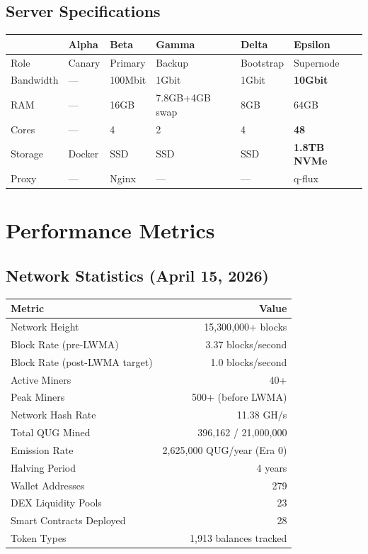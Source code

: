 \documentclass[12pt,a4paper]{article}
\begin{document}
\subsection{Server Specifications}

\begin{center}
\begin{tabular}{@{}llllll@{}}
\toprule
& \textbf{Alpha} & \textbf{Beta} & \textbf{Gamma} & \textbf{Delta} & \textbf{Epsilon} \\
\midrule
Role & Canary & Primary & Backup & Bootstrap & Supernode \\
Bandwidth & --- & 100Mbit & 1Gbit & 1Gbit & \textbf{10Gbit} \\
RAM & --- & 16GB & 7.8GB+4GB swap & 8GB & 64GB \\
Cores & --- & 4 & 2 & 4 & \textbf{48} \\
Storage & Docker & SSD & SSD & SSD & \textbf{1.8TB NVMe} \\
Proxy & --- & Nginx & --- & --- & q-flux \\
\bottomrule
\end{tabular}
\end{center}

\section{Performance Metrics}

\subsection{Network Statistics (April 15, 2026)}

\begin{center}
\begin{tabular}{@{}lr@{}}
\toprule
\textbf{Metric} & \textbf{Value} \\
\midrule
Network Height & 15{,}300{,}000+ blocks \\
Block Rate (pre-LWMA) & 3.37 blocks/second \\
Block Rate (post-LWMA target) & 1.0 blocks/second \\
Active Miners & 40+ \\
Peak Miners & 500+ (before LWMA) \\
Network Hash Rate & 11.38 GH/s \\
Total QUG Mined & 396{,}162 / 21{,}000{,}000 \\
Emission Rate & 2{,}625{,}000 QUG/year (Era 0) \\
Halving Period & 4 years \\
Wallet Addresses & 279 \\
DEX Liquidity Pools & 23 \\
Smart Contracts Deployed & 28 \\
Token Types & 1{,}913 balances tracked \\
\bottomrule
\end{tabular}
\end{center}
\end{document}
